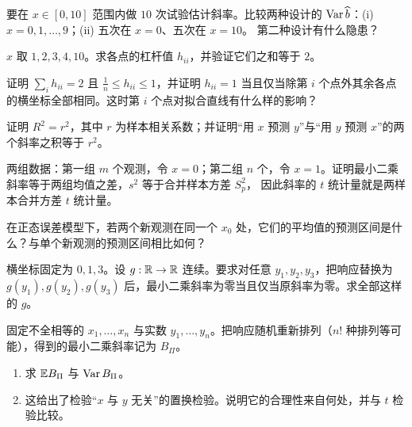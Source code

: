 \begin{exercise}
要在 $x\in[0,10]$ 范围内做 $10$ 次试验估计斜率。比较两种设计的 $\operatorname{Var}\widehat{b}$：(i) $x=0,1,\dots,9$；(ii) 五次在 $x=0$、五次在 $x=10$。
第二种设计有什么隐患？
\end{exercise}

\begin{exercise}
$x$ 取 $1,2,3,4,10$。求各点的杠杆值 $h_{ii}$，并验证它们之和等于 $2$。
\end{exercise}

\levelB
\begin{exercise}
证明 $\sum_i h_{ii}=2$ 且 $\frac1n\le h_{ii}\le1$，并证明 $h_{ii}=1$ 当且仅当除第 $i$ 个点外其余各点的横坐标全部相同。这时第 $i$ 个点对拟合直线有什么样的影响？
\end{exercise}

\begin{exercise}
证明 $R^2=r^2$，其中 $r$ 为样本相关系数；并证明“用 $x$ 预测 $y$”与“用 $y$ 预测 $x$”的两个斜率之积等于 $r^2$。
\end{exercise}

\begin{exercise}
两组数据：第一组 $m$ 个观测，令 $x=0$；第二组 $n$ 个，令 $x=1$。证明最小二乘斜率等于两组均值之差，$s^2$ 等于合并样本方差 $S_p^2$，
因此斜率的 $t$ 统计量就是两样本合并方差 $t$ 统计量。
\end{exercise}

\begin{exercise}
在正态误差模型下，若两个新观测在同一个 $x_0$ 处，它们的平均值的预测区间是什么？与单个新观测的预测区间相比如何？
\end{exercise}

\levelC
\begin{exercise}[原讲义习题 7.1]
横坐标固定为 $0,1,3$。设 $g:\mathbb{R}\to\mathbb{R}$ 连续。要求对任意 $y_1,y_2,y_3$，把响应替换为 $g(y_1),g(y_2),g(y_3)$ 后，最小二乘斜率为零当且仅当原斜率为零。求全部这样的 $g$。
\end{exercise}

\begin{exercise}[原讲义习题 7.7]
固定不全相等的 $x_1,\dots,x_n$ 与实数 $y_1,\dots,y_n$。把响应随机重新排列（$n!$ 种排列等可能），得到的最小二乘斜率记为 $B_\Pi$。
\begin{enumerate}
\item 求 $\mathbb{E} B_\Pi$ 与 $\operatorname{Var} B_\Pi$。
\item 这给出了检验“$x$ 与 $y$ 无关”的置换检验。说明它的合理性来自何处，并与 $t$ 检验比较。
\end{enumerate}
\end{exercise}
